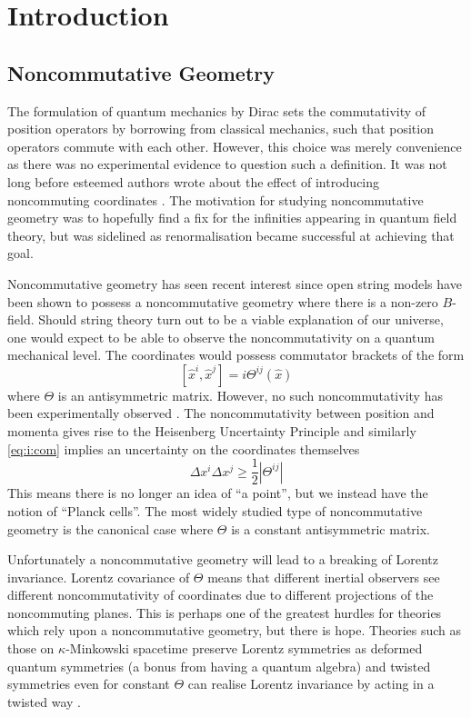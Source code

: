 \chapter{Introduction}
\label{intro}
\section{Noncommutative Geometry}
The formulation of quantum mechanics by Dirac \cite{Dirac} sets the
commutativity of position operators by borrowing from classical mechanics, such
that position operators commute with each other. However, this choice was merely
convenience as there was no experimental evidence to question such a definition.
It was not long before esteemed authors wrote about the effect of introducing
noncommuting coordinates \cite{Snyder:1946qz}. The motivation for studying
noncommutative geometry was to hopefully find a fix for the infinities
appearing in quantum field theory, but was sidelined as renormalisation became
successful at achieving that goal.

Noncommutative geometry has seen recent interest since open string models have
been shown to possess a noncommutative geometry \cite{witten, SW1} where there
is a non-zero $B$-field. Should string theory turn out to be a viable
explanation of our universe, one would expect to be able to observe the
noncommutativity on a quantum mechanical level. The coordinates would possess
commutator brackets of the form
\begin{equation}
  \label{eq:i:com}
  [\hat x^i, \hat x^j]=i\Theta^{ij}(\hat x)
\end{equation}
where $\Theta$ is an antisymmetric matrix. However, no such noncommutativity has
been experimentally observed \cite{Hinchliffe:2002km}. The noncommutativity
between position and momenta gives rise to the Heisenberg Uncertainty Principle
and similarly \eqref{eq:i:com} implies an uncertainty on the coordinates
themselves
\begin{equation}
  \label{eq:i:planck}
  \Delta x^i  \Delta x^j \geq \frac 12|\Theta^{ij}|
\end{equation}
This means there is no longer an idea of ``a point'', but we instead have the
notion of ``Planck cells''. The most widely studied type of noncommutative
geometry is the canonical case where $\Theta$ is a constant antisymmetric
matrix.

Unfortunately a noncommutative geometry will lead to a breaking of Lorentz
invariance. Lorentz covariance of $\Theta$ means that different inertial
observers see different noncommutativity of coordinates due to different
projections of the noncommuting planes. This is perhaps one of the greatest
hurdles for theories which rely upon a noncommutative geometry, but there is
hope. Theories such as those on $\kappa$-Minkowski spacetime
\cite{Dimitrijevic:2003wv} preserve Lorentz symmetries as deformed quantum
symmetries (a bonus from having a quantum algebra) and twisted symmetries even
for constant $\Theta$ can realise Lorentz invariance by acting in a twisted way
\cite{CKNT1, CPT1}.

